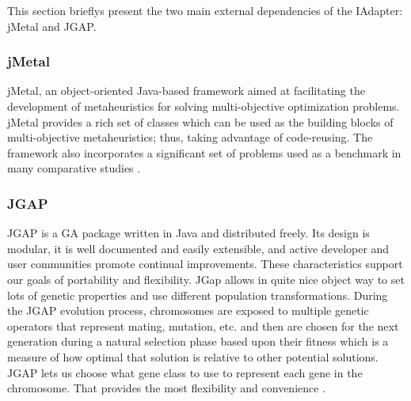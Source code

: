 \documentclass[espaco=umemeio,chapter=TITLE,twoside,openright]{abnt}
\begin{document}
This section brieflys present the two main external dependencies of the IAdapter: jMetal and JGAP.

\subsubsection{jMetal}

jMetal, an object-oriented Java-based framework aimed at facilitating the development of metaheuristics for solving multi-objective optimization problems. jMetal provides
a rich set of classes which can be used as the building blocks of multi-objective metaheuristics; thus, taking advantage of code-reusing. The framework also incorporates a significant set of problems used as a benchmark in many comparative studies \cite{Durillo2006}. 

\subsubsection{JGAP}

JGAP  is a GA package written in Java and distributed freely. Its design is modular, it is well documented and
easily extensible, and active developer and user communities
promote continual improvements. These characteristics support our goals of portability and flexibility. JGap allows in quite nice object way to set lots of genetic properties and use different population transformations. During the JGAP evolution process, chromosomes are exposed to multiple genetic operators that represent mating, mutation, etc. and then are chosen for the next generation during a natural selection phase based upon their fitness which is a measure of how optimal that solution is relative to other potential solutions. JGAP lets us choose what gene class to use to represent each gene in the chromosome. That provides the most flexibility and convenience \cite{Fiebrink2005}.





%

%
\end{document}

